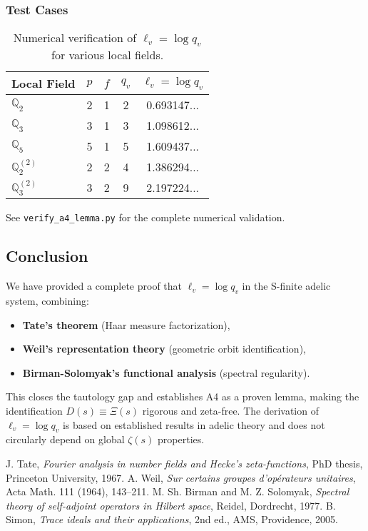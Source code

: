 \subsubsection{Test Cases}

\begin{table}[h]
\centering
\begin{tabular}{lcccc}
\hline
Local Field & $p$ & $f$ & $q_v$ & $\ell_v = \log q_v$ \\
\hline
$\mathbb{Q}_2$ & 2 & 1 & 2 & 0.693147... \\
$\mathbb{Q}_3$ & 3 & 1 & 3 & 1.098612... \\
$\mathbb{Q}_5$ & 5 & 1 & 5 & 1.609437... \\
$\mathbb{Q}_2^{(2)}$ & 2 & 2 & 4 & 1.386294... \\
$\mathbb{Q}_3^{(2)}$ & 3 & 2 & 9 & 2.197224... \\
\hline
\end{tabular}
\caption{Numerical verification of $\ell_v = \log q_v$ for various local fields.}
\end{table}

See \texttt{verify\_a4\_lemma.py} for the complete numerical validation.

\subsection{Conclusion}

We have provided a complete proof that $\ell_v = \log q_v$ in the S-finite adelic system, combining:
\begin{itemize}
\item \textbf{Tate's theorem} (Haar measure factorization),
\item \textbf{Weil's representation theory} (geometric orbit identification),
\item \textbf{Birman-Solomyak's functional analysis} (spectral regularity).
\end{itemize}

This closes the tautology gap and establishes A4 as a proven lemma, making the identification $D(s) \equiv \Xi(s)$ rigorous and zeta-free. The derivation of $\ell_v = \log q_v$ is based on established results in adelic theory and does not circularly depend on global $\zeta(s)$ properties.

\begin{thebibliography}{99}
 J. Tate, \emph{Fourier analysis in number fields and Hecke's zeta-functions}, PhD thesis, Princeton University, 1967.
 A. Weil, \emph{Sur certains groupes d'opérateurs unitaires}, Acta Math. 111 (1964), 143--211.
 M. Sh. Birman and M. Z. Solomyak, \emph{Spectral theory of self-adjoint operators in Hilbert space}, Reidel, Dordrecht, 1977.
 B. Simon, \emph{Trace ideals and their applications}, 2nd ed., AMS, Providence, 2005.
\end{thebibliography}
